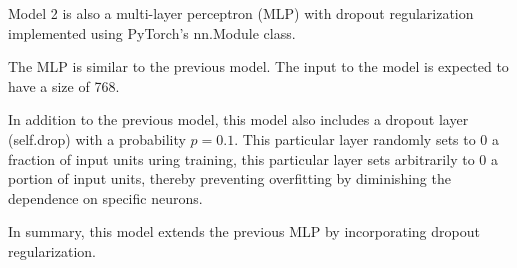
Model 2 is also a multi-layer perceptron (MLP) with dropout regularization implemented using PyTorch's nn.Module class.

The MLP is similar to the previous model. The input to the model is expected to have a size of 768.

In addition to the previous model, this model also includes a dropout layer (self.drop) with a probability $p=0.1$. This particular layer randomly sets to 0 a fraction of input units uring training, this particular layer sets arbitrarily to 0 a portion of input units, thereby preventing overfitting by diminishing the dependence on specific neurons.






In summary, this model extends the previous MLP by incorporating dropout regularization.

